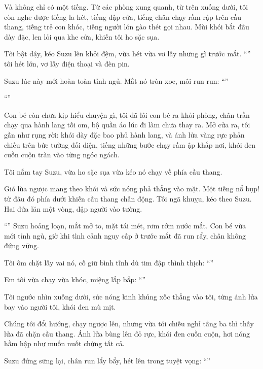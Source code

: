 \documentclass[../main.tex]{subfiles}
\begin{document}
Và không chỉ có một tiếng. Từ các phòng xung quanh, từ trên xuống dưới, tôi còn nghe được tiếng la hét, tiếng đập cửa, tiếng chân chạy rầm rập trên cầu thang, tiếng trẻ con khóc, tiếng người lớn gào thét gọi nhau. Mùi khói bắt đầu dày đặc, len lỏi qua khe cửa, khiến tôi ho sặc sụa.

Tôi bật dậy, kéo Suzu lên khỏi đệm, vừa hét vừa vơ lấy những gì trước mắt. ``'' tôi hét lớn, vơ lấy điện thoại và đèn pin.

Suzu lúc này mới hoàn toàn tỉnh ngủ. Mắt nó tròn xoe, môi run run: ``''

``''

Con bé còn chưa kịp hiểu chuyện gì, tôi đã lôi con bé ra khỏi phòng, chân trần chạy qua hành lang tối om, bộ quần áo lúc đi làm chưa thay ra. Mở cửa ra, tôi gần như rụng rời: khói dày đặc bao phủ hành lang, và ánh lửa vàng rực phản chiếu trên bức tường đối diện, tiếng những bước chạy rầm ập khắp nơi, khói đen cuồn cuộn tràn vào từng ngóc ngách.

Tôi nắm tay Suzu, vừa ho sặc sụa vừa kéo nó chạy về phía cầu thang.

Gió lùa ngược mang theo khói và sức nóng phả thẳng vào mặt. Một tiếng nổ bụp! từ đâu đó phía dưới khiến cầu thang chấn động. Tôi ngã khuỵu, kéo theo Suzu. Hai đứa lăn một vòng, đập người vào tường.

``'' Suzu hoảng loạn, mắt mở to, mặt tái mét, rơm rớm nước mắt. Con bé vừa mới tỉnh ngủ, giờ khi tình cảnh nguy cấp ở trước mắt đã run rẩy, chân không đứng vững.

Tôi ôm chặt lấy vai nó, cố giữ bình tĩnh dù tim đập thình thịch: ``''

Em tôi vừa chạy vừa khóc, miệng lắp bắp: ``''

Tôi ngước nhìn xuống dưới, sức nóng kinh khủng xốc thẳng vào tôi, từng ánh lửa bay vào người tôi, khói đen mù mịt.

Chúng tôi đổi hướng, chạy ngược lên, nhưng vừa tới chiếu nghỉ tầng ba thì thấy lửa đã chặn cầu thang. Ánh lửa bùng lên đỏ rực, khói đen cuồn cuộn, hơi nóng hầm hập như muốn nuốt chửng tất cả.

Suzu đứng sững lại, chân run lẩy bẩy, hét lên trong tuyệt vọng: ``''
\end{document}
